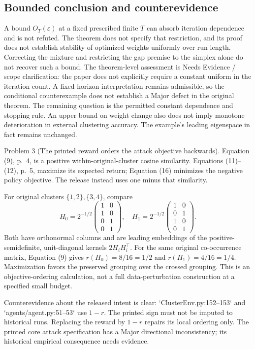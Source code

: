 \documentclass[10pt]{article}
\begin{document}
\subsection*{Bounded conclusion and counterevidence}
A bound \(O_T(\varepsilon)\) at a fixed prescribed finite \(T\) can absorb iteration dependence and is not refuted. The theorem does not specify that restriction, and its proof does not establish stability of optimized weights uniformly over run length. Correcting the mixture and restricting the gap premise to the simplex alone do not recover such a bound. The theorem-level assessment is Needs Evidence / scope clarification: the paper does not explicitly require a constant uniform in the iteration count. A fixed-horizon interpretation remains admissible, so the conditional counterexample does not establish a Major defect in the original theorem. The remaining question is the permitted constant dependence and stopping rule. An upper bound on weight change also does not imply monotone deterioration in external clustering accuracy. The example’s leading eigenspace in fact remains unchanged.\par
Problem 3 (The printed reward orders the attack objective backwards).  Equation (9), p. 4, is a positive within-original-cluster cosine similarity. Equations (11)–(12), p. 5, maximize its expected return; Equation (16) minimizes the negative policy objective. The release instead uses one minus that similarity.\par
For original clusters \(\{1,2\},\{3,4\}\), compare \[H_0=2^{-1/2}\begin{pmatrix}1&0\\1&0\\0&1\\0&1\end{pmatrix},\quad
 H_1=2^{-1/2}\begin{pmatrix}1&0\\0&1\\1&0\\0&1\end{pmatrix}.\] Both have orthonormal columns and are leading embeddings of the positive-semidefinite, unit-diagonal kernels \(2H_iH_i^\top\). For the same original co-occurrence matrix, Equation (9) gives \(r(H_0)=8/16=1/2\) and \(r(H_1)=4/16=1/4\). Maximization favors the preserved grouping over the crossed grouping. This is an objective-ordering calculation, not a full data-perturbation construction at a specified small budget.\par
Counterevidence about the released intent is clear: `ClusterEnv.py:152--153` and `agents/agent.py:51--53` use \(1-r\). The printed sign must not be imputed to historical runs. Replacing the reward by \(1-r\) repairs its local ordering only. The printed core attack specification has a Major directional inconsistency; its historical empirical consequence needs evidence.\par
\end{document}
